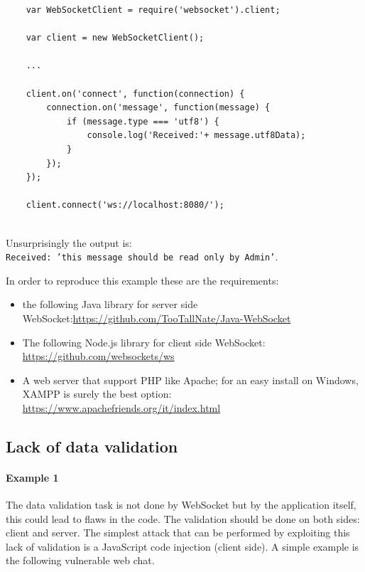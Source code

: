	\begin{lstlisting}
	var WebSocketClient = require('websocket').client;
	
	var client = new WebSocketClient();
	
	...
	
	client.on('connect', function(connection) {
		connection.on('message', function(message) {
			if (message.type === 'utf8') {
				console.log('Received:'+ message.utf8Data);
			}
		});
	});
	
	client.connect('ws://localhost:8080/');
	
	\end{lstlisting}
	
	Unsurprisingly the output is:\\
	\texttt{Received: 'this message should be read only by Admin'}.\newline
	
	In order to reproduce this example these are the requirements:
	\begin{itemize}
		\item the following Java library for server side WebSocket:\url{https://github.com/TooTallNate/Java-WebSocket}
		\item The following Node.js library for client side WebSocket: \url{https://github.com/websockets/ws}
		\item A web server that support PHP like Apache; for an easy install on Windows, XAMPP is surely the best option: \url{https://www.apachefriends.org/it/index.html}
	\end{itemize}
	
	\subsection{Lack of data validation}
	
	\paragraph{Example 1} The data validation task is not done by WebSocket but by the application itself, this could lead to flaws in the code.\newline
	The validation should be done on both sides: client and server.\newline
	The simplest attack that can be performed by exploiting this lack of validation is a JavaScript code injection (client side).\newline
	A simple example is the following vulnerable web chat.\newline
	
